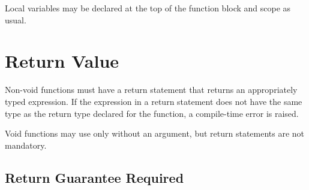 Local variables may be declared at the top of the function block and
scope as usual.

\section{Return Value}\label{function-returns.section}

Non-void functions must have a return statement that returns an
appropriately typed expression.   If the expression in a return
statement does not have the same type as the return type declared for
the function, a compile-time error is raised.

Void functions may use  only without an argument, but
return statements are not mandatory.

\subsection{Return Guarantee Required}


